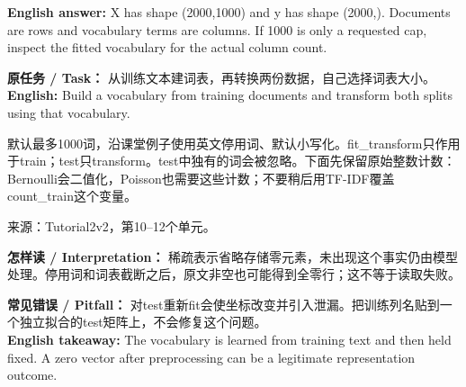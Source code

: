 \textbf{English answer:} X has shape (2000,1000) and y has shape (2000,). Documents are rows and vocabulary terms are columns. If 1000 is only a requested cap, inspect the fitted vocabulary for the actual column count.







\textbf{原任务 / Task：} 从训练文本建词表，再转换两份数据，自己选择词表大小。\\

\textbf{English:} Build a vocabulary from training documents and transform both splits using that vocabulary.


默认最多1000词，沿课堂例子使用英文停用词、默认小写化。fit\_transform只作用于train；test只transform。test中独有的词会被忽略。下面先保留原始整数计数：Bernoulli会二值化，Poisson也需要这些计数；不要稍后用TF-IDF覆盖count\_train这个变量。


来源：Tutorial2v2，第10–12个单元。








\textbf{怎样读 / Interpretation：} 稀疏表示省略存储零元素，未出现这个事实仍由模型处理。停用词和词表截断之后，原文非空也可能得到全零行；这不等于读取失败。


\textbf{常见错误 / Pitfall：} 对test重新fit会使坐标改变并引入泄漏。把训练列名贴到一个独立拟合的test矩阵上，不会修复这个问题。\\

\textbf{English takeaway:} The vocabulary is learned from training text and then held fixed. A zero vector after preprocessing can be a legitimate representation outcome.








